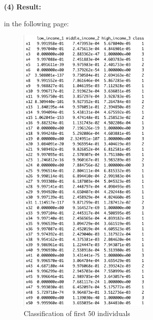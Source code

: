 \documentclass[11pt]{article}
\renewcommand\part[1]{\vspace{.10in}\textbf{(#1)}}
\newcommand\result{\vspace{.10in}\textbf{Result: }}
\begin{document}
\part{4}
\result{ in the following page:
    \begin{figure}[H]
    \centering
    \includegraphics[width=0.6\textwidth]{result.JPG}
    \caption{Classification of first 50 individuals}
\end{figure}
}
\end{document}
